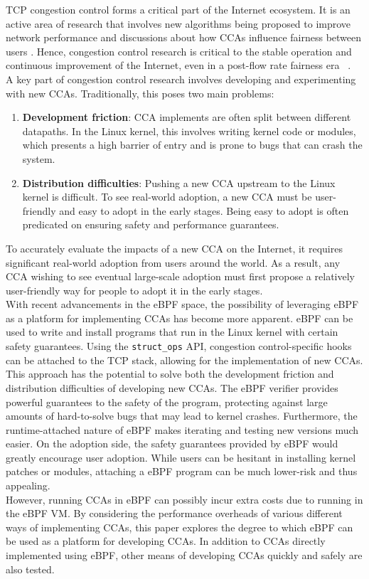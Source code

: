 \documentclass[../main.tex]{subfiles}
\begin{document}
TCP congestion control forms a critical part of the Internet ecosystem. It is an active area of research that involves new algorithms being proposed to improve network performance \cite{CCA-BBR, CCA-FCC} and discussions about how CCAs influence fairness between users \cite{CCAStarvation, CCA-Fairness}. Hence, congestion control research is critical to the stable operation and continuous improvement of the Internet, even in a post-flow rate fairness era ~\cite{PrinciplesForCongestionManagement, Dismantling}.\\
A key part of congestion control research involves developing and experimenting with new CCAs. Traditionally, this poses two main problems:
\begin{enumerate}
    \item {\bf Development friction}: CCA implements are often split between different datapaths. In the Linux kernel, this involves writing kernel code or modules, which presents a high barrier of entry and is prone to bugs that can crash the system.
    \item {\bf Distribution difficulties}: Pushing a new CCA upstream to the Linux kernel is difficult. To see real-world adoption, a new CCA must be user-friendly and easy to adopt in the early stages. Being easy to adopt is often predicated on ensuring safety and performance guarantees.
\end{enumerate}
To accurately evaluate the impacts of a new CCA on the Internet, it requires significant real-world adoption from users around the world. As a result, any CCA wishing to see eventual large-scale adoption must first propose a relatively user-friendly way for people to adopt it in the early stages. \\
With recent advancements in the eBPF space, the possibility of leveraging eBPF as a platform for implementing CCAs has become more apparent. eBPF \cite{ebpf} can be used to write and install programs that run in the Linux kernel with certain safety guarantees. Using the \texttt{struct\_ops} API, congestion control-specific hooks can be attached to the TCP stack, allowing for the implementation of new CCAs. This approach has the potential to solve both the development friction and distribution difficulties of developing new CCAs. The eBPF verifier provides powerful guarantees to the safety of the program, protecting against large amounts of hard-to-solve bugs that may lead to kernel crashes. Furthermore, the runtime-attached nature of eBPF makes iterating and testing new versions much easier. On the adoption side, the safety guarantees provided by eBPF would greatly encourage user adoption. While users can be hesitant in installing kernel patches or modules, attaching a eBPF program can be much lower-risk and thus appealing. \\
However, running CCAs in eBPF can possibly incur extra costs due to running in the eBPF VM. By considering the performance overheads of various different ways of implementing CCAs, this paper explores the degree to which eBPF can be used as a platform for developing CCAs. In addition to CCAs directly implemented using eBPF, other means of developing CCAs quickly and safely are also tested.
\end{document}
